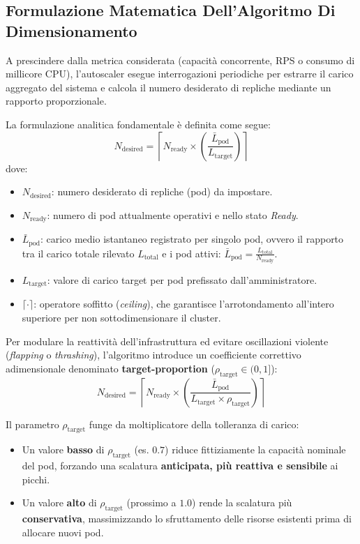 \documentclass[11pt, a4paper]{article}
\begin{document}
\subsection{Formulazione Matematica Dell'Algoritmo Di Dimensionamento}
A prescindere dalla metrica considerata (capacità concorrente, RPS o consumo di millicore CPU), l'autoscaler esegue interrogazioni periodiche per estrarre il carico aggregato del sistema e calcola il numero desiderato di repliche mediante un rapporto proporzionale.

La formulazione analitica fondamentale è definita come segue:
\begin{equation}
    N_{\text{desired}} = \left\lceil N_{\text{ready}} \times \left( \frac{\bar{L}_{\text{pod}}}{L_{\text{target}}} \right) \right\rceil
\end{equation}
dove:
\begin{itemize}[noitemsep]
    \item $N_{\text{desired}}$: numero desiderato di repliche (pod) da impostare.
    \item $N_{\text{ready}}$: numero di pod attualmente operativi e nello stato \emph{Ready}.
    \item $\bar{L}_{\text{pod}}$: carico medio istantaneo registrato per singolo pod, ovvero il rapporto tra il carico totale rilevato $L_{\text{total}}$ e i pod attivi: $\bar{L}_{\text{pod}} = \frac{L_{\text{total}}}{N_{\text{ready}}}$.
    \item $L_{\text{target}}$: valore di carico target per pod prefissato dall'amministratore.
    \item $\lceil \cdot \rceil$: operatore soffitto (\emph{ceiling}), che garantisce l'arrotondamento all'intero superiore per non sottodimensionare il cluster.
\end{itemize}

Per modulare la reattività dell'infrastruttura ed evitare oscillazioni violente (\emph{flapping} o \emph{thrashing}), l'algoritmo introduce un coefficiente correttivo adimensionale denominato \textbf{target-proportion} ($\rho_{\text{target}} \in (0, 1]$):
\begin{equation}
    \boxed{N_{\text{desired}} = \left\lceil N_{\text{ready}} \times \left( \frac{\bar{L}_{\text{pod}}}{L_{\text{target}} \times \rho_{\text{target}}} \right) \right\rceil}
\end{equation}

Il parametro $\rho_{\text{target}}$ funge da moltiplicatore della tolleranza di carico:
\begin{itemize}[noitemsep]
    \item Un valore \textbf{basso} di $\rho_{\text{target}}$ (es. $0.7$) riduce fittiziamente la capacità nominale del pod, forzando una scalatura \textbf{anticipata, più reattiva e sensibile} ai picchi.
    \item Un valore \textbf{alto} di $\rho_{\text{target}}$ (prossimo a $1.0$) rende la scalatura più \textbf{conservativa}, massimizzando lo sfruttamento delle risorse esistenti prima di allocare nuovi pod.
\end{itemize}
\end{document}
